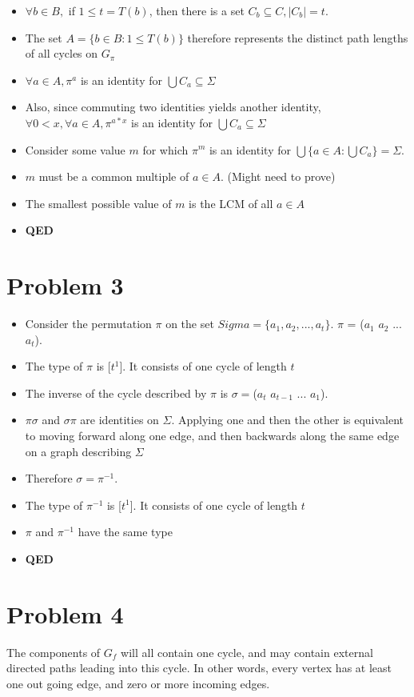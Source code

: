 \documentclass[]{article}
\begin{document}
\begin{enumerate}
\begin{itemize}
		\item $\forall b \in B,$ if  $1 \leq t = T(b)$, then there is a set $C_b \subseteq C, |C_b| = t$.
		\item The set $A = \{b \in B : 1 \leq T(b)\}$ therefore represents the distinct path lengths of all cycles on $G_{\pi}$
		\item $\forall a \in A, \pi^a$ is an identity for $\bigcup C_a \subseteq \Sigma$
		\item Also, since commuting two identities yields another identity, $\forall 0 < x, \forall a \in A, \pi^{a * x}$ is an identity for $\bigcup C_a \subseteq \Sigma$
		\item Consider some value $m$ for which $\pi^{m}$ is an identity for $\bigcup \{a \in A : \bigcup C_a\} = \Sigma$.
		\item $m$ must be a common multiple of $a \in A$. (Might need to prove)
		\item The smallest possible value of $m$ is the LCM of all $a \in A$
		\item \textbf{QED}
	\end{itemize}
\end{enumerate}

\section{Problem 3}
\begin{itemize}
	\item Consider the permutation $\pi$ on the set $Sigma = \{a_1, a_2, ..., a_t\}$. $\pi$ = ($a_1$ $a_2$ ... $a_t$).
	\item The type of $\pi$ is [$t^1$]. It consists of one cycle of length $t$
	\item The inverse of the cycle described by $\pi$ is $\sigma = $($a_t$ $a_{t-1}$ ... $a_1$).
	\item $\pi\sigma$ and $\sigma\pi$ are identities on $\Sigma$. Applying one and then the other is equivalent to moving forward along one edge, and then backwards along the same edge on a graph describing $\Sigma$
	\item Therefore $\sigma = \pi^{-1}$.
	\item The type of $\pi^{-1}$ is [$t^1$]. It consists of one cycle of length $t$
	\item $\pi$ and $\pi^{-1}$ have the same type
	\item \textbf{QED}
\end{itemize}

\section{Problem 4}
The components of $G_f$ will all contain one cycle, and may contain external directed paths leading into this cycle. In other words, every vertex has at least one out going edge, and zero or more incoming edges.
\end{document}
